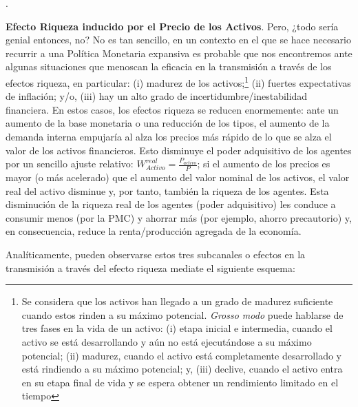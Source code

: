 \documentclass[10pt,a4paper]{article}
\newcounter{numitem}
\newenvironment{lnum}
      {\begin{list}{\arabic{numitem}.}{%
          \usecounter{numitem}%
          \setlength{\leftmargin}{1cm}%
          \setlength{\parskip}{3pt}%
          \setlength{\itemsep}{0pt}%
          \setlength{\parsep}{0pt}%
      }}
      {\end{list}}
\begin{document}
\begin{lnum}
    \item \textbf{Efecto Riqueza inducido por el Precio de los Activos}. Pero, ¿todo sería genial entonces, no? No es tan sencillo, en un contexto en el que se hace necesario recurrir a una Política Monetaria expansiva es probable que nos encontremos ante algunas situaciones que menoscan la eficacia en la transmisión a través de los efectos riqueza, en particular: (i) madurez de los activos;\footnote{%
        Se considera que los activos han llegado a un grado de madurez suficiente cuando estos rinden a su máximo potencial. \textit{Grosso modo} puede hablarse de tres fases en la vida de un activo: (i) etapa inicial e intermedia, cuando el activo se está desarrollando y aún no está ejecutándose a su máximo potencial; (ii) madurez, cuando el activo está completamente desarrollado y está rindiendo a su máximo potencial; y, (iii) declive, cuando el activo entra en su etapa final de vida y se espera obtener un rendimiento limitado en el tiempo
    } (ii) fuertes expectativas de inflación; y/o, (iii) hay un alto grado de incertidumbre/inestabilidad financiera. En estos casos, los efectos riqueza se reducen enormemente: ante un aumento de la base monetaria o una reducción de los tipos, el aumento de la demanda interna empujaría al alza los precios más rápido de lo que se alza el valor de los activos financieros. Esto disminuye el poder adquisitivo de los agentes por un sencillo ajuste relativo: $W^{real}_{Activo}=\frac{P_{activo}}{P}$; si el aumento de los precios es mayor (o más acelerado) que el aumento del valor nominal de los activos, el valor real del activo disminue y, por tanto, también la riqueza de los agentes. Esta disminución de la riqueza real de los agentes (poder adquisitivo) les conduce a consumir menos (por la PMC) y ahorrar más (por ejemplo, ahorro precautorio) y, en consecuencia, reduce la renta/producción agregada de la economía.
\end{lnum}

Analíticamente, pueden observarse estos tres subcanales o efectos en la transmisión a través del efecto riqueza mediate el siguiente esquema:
\end{document}
